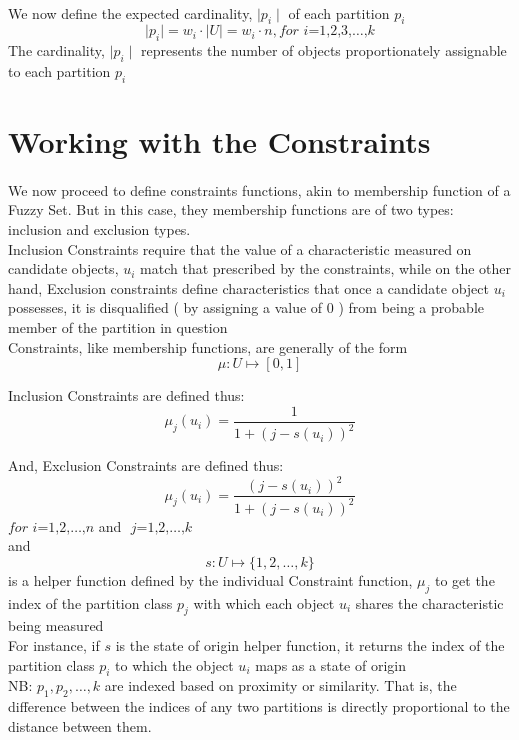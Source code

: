 \documentclass[a4paper,openany]{book}
\begin{document}
			\paragraph{}We 
				now define the expected cardinality, $\mid p_i \mid$ of each partition $p_i$
				\begin{equation}
					\mid p_i \mid = w_i \cdot \mid U \mid = w_i \cdot n, \textit{for i=1,2,3,}\dots\text{,}k
				\end{equation}
				The cardinality, $\mid p_i \mid$ represents the number of objects proportionately assignable to each partition $p_i$
		\section{Working with the Constraints}
			\paragraph{}
				We now proceed to define constraints functions, akin to membership function of a Fuzzy Set. But in this case, they membership functions are of two types: inclusion and exclusion types.\\
				Inclusion Constraints require that the value of a characteristic measured on candidate objects, $u_i$ match that prescribed by the constraints, while on the other hand, Exclusion constraints define characteristics that once a candidate object $u_i$ possesses, it is disqualified ( by assigning a value of 0 ) from being a probable member of the partition in question\\
				Constraints, like membership functions, are generally of the form
				\[
					\mu \colon U \mapsto [ 0,1 ]
				\]
				
				Inclusion Constraints are defined thus:
				\begin{equation}
					\mu_j(u_i) = \frac{1}{1+\left( j - s(u_i) \right)^2}
				\end{equation}
				
				And, Exclusion Constraints are defined thus:
				\begin{equation}
					\mu_j(u_i) = \frac{\left( j - s(u_i) \right)^2}{1+\left( j - s(u_i) \right)^2}
				\end{equation}
				$\textit{for i=1,2,}\dots\text{,}n$ and $\textit{ j=1,2,}\dots\text{,}k$\\
				and
				\begin{equation}
					s\colon U\mapsto \{ 1,2,\dots,k \}
				\end{equation}
				is a helper function defined by the individual Constraint function, $\mu_j$ to get the index of the partition class $p_j$ with which each object $u_i$ shares the characteristic being measured\\
				For instance, if $s$ is the state of origin helper function, it returns the index of the partition class $p_i$ to which the object $u_i$ maps as a state of origin\\
				NB: $p_1, p_2,\dots,k$ are indexed based on proximity or similarity. That is, the difference between the indices of any two partitions is directly proportional to the distance between them.
\end{document}
